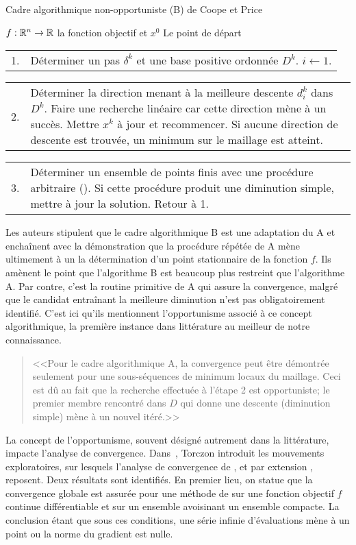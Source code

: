 \begin{algorithm}[H]
	\caption{\textsf{Cadre algorithmique non-opportuniste (B) de Coope et Price}}
	\label{A}
\begin{algorithmic}
		\STATE $f:\mathbb{R}^n\rightarrow \mathbb{R}$ la fonction objectif et $x^0$ Le point de départ 
		\STATE  \begin{tabularx}{440pt}{l X}
			1. & Déterminer un pas $\delta ^k$ et une base positive ordonnée $D^k$. $i \leftarrow 1$.
		\end{tabularx}
	\STATE \begin{tabularx}{440pt}{l X}
		2. & Déterminer la direction menant à la meilleure descente $d_i^k$ dans $D^k$. Faire une recherche linéaire car cette direction mène à un succès. Mettre $x^k$ à jour et recommencer. Si aucune direction de descente est trouvée, un minimum sur le maillage est atteint.
	\end{tabularx}
		\STATE \begin{tabularx}{440pt}{l X}3. & Déterminer un ensemble de points finis avec une procédure arbitraire (\SEARCH). Si cette procédure produit une diminution simple, mettre à jour la solution. Retour à 1.
		\end{tabularx}
\end{algorithmic}
\end{algorithm}
Les auteurs stipulent que le cadre algorithmique B est une adaptation du A et enchaînent avec la démonstration que la procédure répétée de A mène ultimement à un la détermination d'un point stationnaire de la fonction $f$. Ils amènent le point que l'algorithme B est beaucoup plus restreint que l'algorithme A. Par contre, c'est la routine primitive de A qui assure la convergence, malgré que le candidat entraînant la meilleure diminution n'est pas obligatoirement identifié. C'est ici qu'ils mentionnent l'opportunisme associé à ce concept algorithmique, la première instance dans littérature au meilleur de notre connaissance.
\begin{quote}
	<<Pour le cadre algorithmique A, la convergence peut être démontrée seulement pour une sous-séquences de minimum locaux du maillage. Ceci est dû au fait que la recherche effectuée à l'étape 2 est opportuniste; le premier membre rencontré dans $D$ qui donne une descente (diminution simple) mène à un nouvel itéré.>>
\end{quote}
La concept de l'opportunisme, souvent désigné autrement dans la littérature, impacte l'analyse de convergence. Dans~\cite{Torc97a}, Torczon introduit les mouvements exploratoires, sur lesquels l'analyse de convergence de \GPS, et par extension \CS, reposent. Deux résultats sont identifiés. En premier lieu, on statue que la convergence globale est assurée pour une méthode de \GPS sur une fonction objectif $f$ continue différentiable et sur un ensemble avoisinant un ensemble compacte. La conclusion étant que sous ces conditions, une série infinie d'évaluations mène à un point ou la norme du gradient est nulle.
